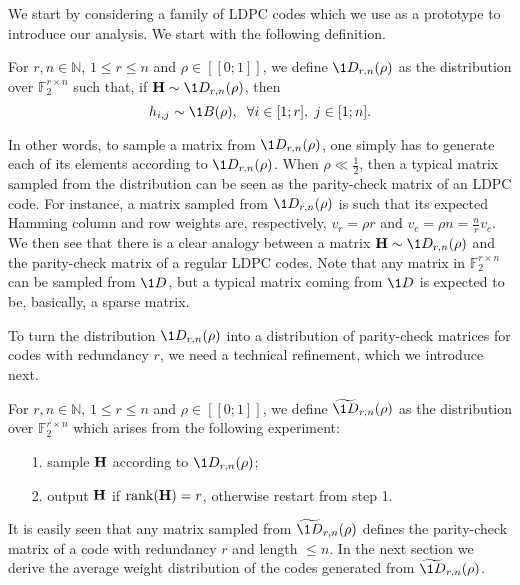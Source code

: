 We start by considering a family of LDPC codes which we use as a prototype to introduce our analysis.
We start with the following definition.
\begin{definition}\label{def:family_one}
For $r,n\in\mathbb N$, $1\leq r\leq n$ and $\rho\in[\![ 0 ; 1]\!]$, we define $\1{D}_{r,n}(\rho)$ as the distribution over $\mathbb F_2^{r\times n}$ such that, if $\6H\sim \1{D}_{r,n}(\rho)$, then 
$$h_{i,j}\sim \1{B}(\rho),\hspace{2mm}\forall i\in[1;r],\hspace{1mm}j\in[1;n].$$
\end{definition}
In other words, to sample a matrix from $\1{D}_{r,n}(\rho)$, one simply has to generate each of its elements according to $\1{D}_{r,n}(\rho)$.
When $\rho \ll \frac{1}{2}$, then a typical matrix sampled from the distribution can be seen as the parity-check matrix of an LDPC code.
For instance, a matrix sampled from $\1{D}_{r,n}(\rho)$ is such that its expected Hamming column and row weights are, respectively, $v_r = \rho r$ and $v_c = \rho n = \frac{n}{r}v_c$.
We then see that there is a clear analogy between a matrix $\6H\sim\1{D}_{r,n}(\rho)$ and the parity-check matrix of a regular LDPC codes.
Note that any matrix in $\mathbb F_2^{r\times n}$ can be sampled from $\1{D}$, but a typical matrix coming from $\1{D}$ is expected to be, basically, a sparse matrix.

To turn the distribution $\1{D}_{r,n}(\rho)$ into a distribution of parity-check matrices for codes with redundancy $r$, we need a technical refinement, which we introduce next.
\begin{definition}\label{def:family_one}
For $r,n\in\mathbb N$, $1\leq r\leq n$ and $\rho\in[\![ 0 ; 1]\!]$, we define $\widetilde{\1{D}}_{r,n}(\rho)$ as the distribution over $\mathbb F_2^{r\times n}$ which arises from the following experiment:
\begin{itemize}
    \item[1. ] sample $\mathbf H$ according to $\1{D}_{r,n}(\rho)$;
    \item[2. ] output $\mathbf H$ if $\mathrm{rank}(\mathbf H) = r$, otherwise restart from step 1.
\end{itemize}
\end{definition}
It is easily seen that any matrix sampled from $\widetilde{\1{D}}_{r,n}(\rho)$ defines the parity-check matrix of a code with redundancy $r$ and length $\leq n$.
In the next section we derive the average weight distribution of the codes generated from $\widetilde{\1{D}}_{r,n}(\rho)$.

